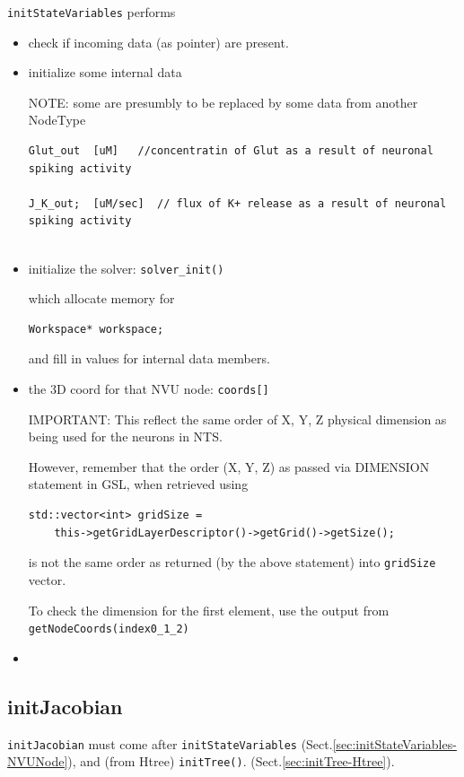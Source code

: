 \verb!initStateVariables! performs 
\begin{itemize}
  \item check if incoming data (as pointer) are present.
  
  \item initialize some internal data
  
NOTE: some are presumbly to be replaced by some data from another NodeType
\begin{verbatim}
Glut_out  [uM]   //concentratin of Glut as a result of neuronal spiking activity

J_K_out;  [uM/sec]  // flux of K+ release as a result of neuronal spiking activity


\end{verbatim}  


  \item initialize the solver: \verb!solver_init()!   
  
  which allocate memory for 
\begin{verbatim}
Workspace* workspace;
\end{verbatim}
and fill in values for internal data members.
  
  \item the 3D coord for that NVU node: \verb!coords[]!
  
IMPORTANT: This reflect the same order of X, Y, Z physical dimension as 
being used for the neurons in NTS.

However, remember that the order (X, Y, Z) as passed via DIMENSION statement in GSL, when retrieved using
\begin{verbatim}
std::vector<int> gridSize = 
    this->getGridLayerDescriptor()->getGrid()->getSize();
\end{verbatim}
is not the same order as returned (by the above statement) into \verb!gridSize! vector.

To check the dimension for the first element, use the output from \verb!getNodeCoords(index0_1_2)!   
  
  \item 
\end{itemize}

\subsection{initJacobian}
\label{sec:initJacobian-NVUNode}

\verb!initJacobian! must come after \verb!initStateVariables!
(Sect.\ref{sec:initStateVariables-NVUNode}), and (from Htree) \verb!initTree()!.
(Sect.\ref{sec:initTree-Htree}).





